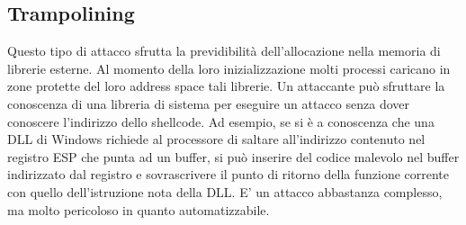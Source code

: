 \subsection{Trampolining}
Questo tipo di attacco sfrutta la previdibilità dell'allocazione nella memoria di librerie esterne. Al momento della loro inizializzazione molti processi caricano in zone protette del loro address space tali librerie. Un attaccante può sfruttare la conoscenza di una libreria di sistema per eseguire un attacco senza dover conoscere l'indirizzo dello shellcode. Ad esempio, se si è a conoscenza che una DLL di Windows richiede al processore di saltare all'indirizzo contenuto nel registro ESP che punta ad un buffer, si può inserire del codice malevolo nel buffer indirizzato dal registro e sovrascrivere il punto di ritorno della funzione corrente con quello dell'istruzione nota della DLL. E' un attacco abbastanza complesso, ma molto pericoloso in quanto automatizzabile.
